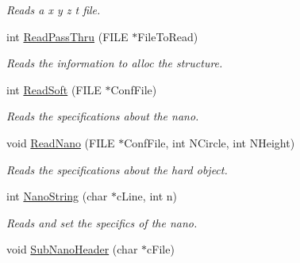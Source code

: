 \begin{DoxyCompactItemize}
\begin{DoxyCompactList}\small\item\em Reads a x y z t file. \end{DoxyCompactList}\item 
int \hyperlink{classVarData_a189598b2b9b9d99be1e12d720e2a4426}{Read\+Pass\+Thru} (F\+I\+LE $\ast$File\+To\+Read)\hypertarget{classVarData_a189598b2b9b9d99be1e12d720e2a4426}{}\label{classVarData_a189598b2b9b9d99be1e12d720e2a4426}

\begin{DoxyCompactList}\small\item\em Reads the information to alloc the structure. \end{DoxyCompactList}\item 
int \hyperlink{classVarData_a9c617ac56900ea72944af62fc4befdca}{Read\+Soft} (F\+I\+LE $\ast$Conf\+File)\hypertarget{classVarData_a9c617ac56900ea72944af62fc4befdca}{}\label{classVarData_a9c617ac56900ea72944af62fc4befdca}

\begin{DoxyCompactList}\small\item\em Reads the specifications about the nano. \end{DoxyCompactList}\item 
void \hyperlink{classVarData_ae1bc84ff2d8831db8949506045848d0f}{Read\+Nano} (F\+I\+LE $\ast$Conf\+File, int N\+Circle, int N\+Height)\hypertarget{classVarData_ae1bc84ff2d8831db8949506045848d0f}{}\label{classVarData_ae1bc84ff2d8831db8949506045848d0f}

\begin{DoxyCompactList}\small\item\em Reads the specifications about the hard object. \end{DoxyCompactList}\item 
int \hyperlink{classVarData_a0d71010a276631e9621af79f7a41a6bc}{Nano\+String} (char $\ast$c\+Line, int n)\hypertarget{classVarData_a0d71010a276631e9621af79f7a41a6bc}{}\label{classVarData_a0d71010a276631e9621af79f7a41a6bc}

\begin{DoxyCompactList}\small\item\em Reads and set the specifics of the nano. \end{DoxyCompactList}\item 
void \hyperlink{classVarData_aede3befcfc5ac25f61c9d9ed00e66f18}{Sub\+Nano\+Header} (char $\ast$c\+File)\hypertarget{classVarData_aede3befcfc5ac25f61c9d9ed00e66f18}{}\label{classVarData_aede3befcfc5ac25f61c9d9ed00e66f18}


\end{DoxyCompactItemize}
